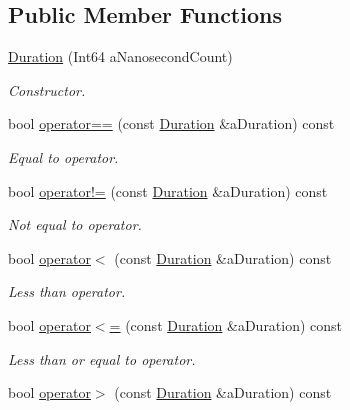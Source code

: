 \subsection*{Public Member Functions}
\begin{DoxyCompactItemize}
\item 
\hyperlink{classlibrary_1_1physics_1_1time_1_1_duration_a0a70efcf487a841da572afcf00001f64}{Duration} (Int64 a\+Nanosecond\+Count)
\begin{DoxyCompactList}\small\item\em Constructor. \end{DoxyCompactList}\item 
bool \hyperlink{classlibrary_1_1physics_1_1time_1_1_duration_ac368d2fe8d2a04248dac2b53bdfbfb21}{operator==} (const \hyperlink{classlibrary_1_1physics_1_1time_1_1_duration}{Duration} \&a\+Duration) const
\begin{DoxyCompactList}\small\item\em Equal to operator. \end{DoxyCompactList}\item 
bool \hyperlink{classlibrary_1_1physics_1_1time_1_1_duration_a620feff807a95ea439fdfdd5cf5490b2}{operator!=} (const \hyperlink{classlibrary_1_1physics_1_1time_1_1_duration}{Duration} \&a\+Duration) const
\begin{DoxyCompactList}\small\item\em Not equal to operator. \end{DoxyCompactList}\item 
bool \hyperlink{classlibrary_1_1physics_1_1time_1_1_duration_a90fbdc66d103d7ce07122224db6fc1d9}{operator$<$} (const \hyperlink{classlibrary_1_1physics_1_1time_1_1_duration}{Duration} \&a\+Duration) const
\begin{DoxyCompactList}\small\item\em Less than operator. \end{DoxyCompactList}\item 
bool \hyperlink{classlibrary_1_1physics_1_1time_1_1_duration_a95d806324b7235b0dec175bde4996e7c}{operator$<$=} (const \hyperlink{classlibrary_1_1physics_1_1time_1_1_duration}{Duration} \&a\+Duration) const
\begin{DoxyCompactList}\small\item\em Less than or equal to operator. \end{DoxyCompactList}\item 
bool \hyperlink{classlibrary_1_1physics_1_1time_1_1_duration_ac7fa93e402efc7c23f1acb8df9b54c79}{operator$>$} (const \hyperlink{classlibrary_1_1physics_1_1time_1_1_duration}{Duration} \&a\+Duration) const

\end{DoxyCompactItemize}
